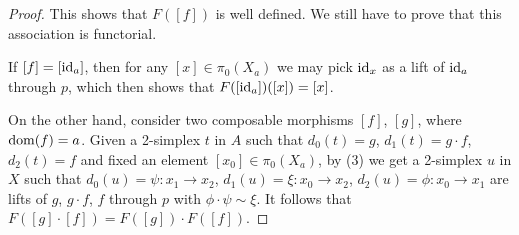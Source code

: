 \documentclass[a4paper,11pt,openany]{scrartcl}
\begin{document}
\begin{proof}
    This shows that $F([f])$ is well defined. We still have to prove that this
    association is functorial.

    If $[f]=[\operatorname{id}_a]$, then for any $[x]\in\pi_0(X_a)$ we may pick $\operatorname{id}_x$ as a
    lift of $\operatorname{id}_a$ through $p$, which then shows that $F([\operatorname{id}_a])([x])=[x]$.

    On the other hand, consider two composable morphisms $[f]$, $[g]$, where
    $\operatorname{dom}(f)=a$. Given a
    2-simplex $t$ in $A$ such that $d_0(t)=g$, $d_1(t)=g\cdot f$, $d_2(t)=f$ and
    fixed an element $[x_0]\in\pi_0(X_a)$, by (3) we get a 2-simplex $u$ in $X$
    such that $d_0(u)=\psi\colon x_1\rightarrow x_2$, $d_1(u)=\xi\colon
    x_0\rightarrow x_2$, $d_2(u)=\phi\colon x_0\rightarrow x_1$ are lifts of
    $g$, $g\cdot f$, $f$ through $p$ with $\phi\cdot\psi\sim\xi$. It follows
    that $F([g]\cdot [f])=F([g])\cdot F([f])$.
\end{proof}
\end{document}
